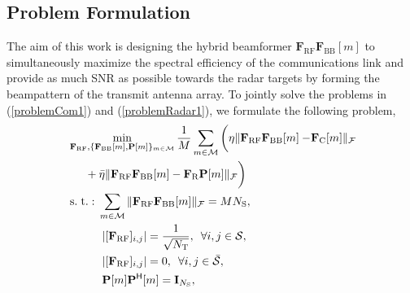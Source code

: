\documentclass[journal,10pt]{IEEEtran}
\DeclareMathOperator*{\subjectto}{s.\hspace{3pt} t.:\hspace{3pt}} %
\begin{document}
	
	
	
	
	
	
	
	
	
	
	
	
	\subsection{Problem Formulation}
	The aim of this work is designing the hybrid beamformer $\mathbf{F}_\mathrm{RF}\mathbf{F}_\mathrm{BB}[m]$ to simultaneously maximize  the spectral efficiency of the communications link and provide as much SNR as possible towards the radar targets by forming the beampattern of the transmit antenna array. To jointly solve the problems in (\ref{problemCom1}) and (\ref{problemRadar1}), we formulate the following problem, {\color{black}
		\begin{align}
		\label{problem1}
		&\min_{\mathbf{F}_\mathrm{RF},\{\mathbf{F}_\mathrm{BB}[m],\mathbf{P}[m]\}_{m\in \mathcal{M}}} \frac{1}{M}\sum_{m \in \mathcal{M}} \bigg(\eta \|\mathbf{F}_\mathrm{RF}\mathbf{F}_\mathrm{BB}[m]  - \hspace{-2pt} \mathbf{F}_\mathrm{C}[m]\|_\mathcal{F} \hspace{-2pt} \nonumber \\
		& \hspace{15pt}+ \bar{\eta}\|\mathbf{F}_\mathrm{RF}\mathbf{F}_\mathrm{BB}[m]  -  \mathbf{F}_\mathrm{R}\mathbf{P}[m]\|_\mathcal{F} \bigg) \nonumber \\
		&\subjectto \hspace{0pt} \sum_{m \in \mathcal{M}}\| \mathbf{F}_\mathrm{RF}\mathbf{F}_\mathrm{BB}[m] \|_\mathcal{F} = MN_\mathrm{S}, \nonumber \\
		&\hspace{30pt} |[\mathbf{F}_\mathrm{RF}]_{i,j}| = \frac{1}{\sqrt{N_\mathrm{T}}}, \hspace{5pt} \forall i,j\in \mathcal{S}, \nonumber \\
		&\hspace{30pt} |[\mathbf{F}_\mathrm{RF}]_{i,j}| = 0, \hspace{5pt} \forall i,j\in \bar{\mathcal{S}}, \nonumber \\
		& \hspace{30pt}\mathbf{P}[m]\mathbf{P}^\textsf{H}[m] = \mathbf{I}_{N_\mathrm{S}},
		\end{align}}
\end{document}
